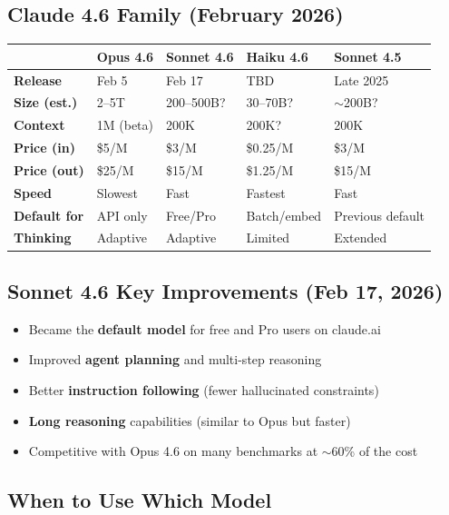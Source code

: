 \documentclass[11pt,a4paper]{article}
\begin{document}
\subsection{Claude 4.6 Family (February 2026)}

\begin{center}
\begin{tabular}{L{2.5cm}L{2.5cm}L{2.5cm}L{2.5cm}L{2.5cm}}
\toprule
& \textbf{Opus 4.6} & \textbf{Sonnet 4.6} & \textbf{Haiku 4.6} & \textbf{Sonnet 4.5} \\
\midrule
\textbf{Release} & Feb 5 & Feb 17 & TBD & Late 2025 \\
\textbf{Size (est.)} & 2--5T & 200--500B? & 30--70B? & $\sim$200B? \\
\textbf{Context} & 1M (beta) & 200K & 200K? & 200K \\
\textbf{Price (in)} & \$5/M & \$3/M & \$0.25/M & \$3/M \\
\textbf{Price (out)} & \$25/M & \$15/M & \$1.25/M & \$15/M \\
\textbf{Speed} & Slowest & Fast & Fastest & Fast \\
\textbf{Default for} & API only & Free/Pro & Batch/embed & Previous default \\
\textbf{Thinking} & Adaptive & Adaptive & Limited & Extended \\
\bottomrule
\end{tabular}
\end{center}

\subsection{Sonnet 4.6 Key Improvements (Feb 17, 2026)}

\begin{itemize}[itemsep=1pt]
  \item Became the \textbf{default model} for free and Pro users on claude.ai
  \item Improved \textbf{agent planning} and multi-step reasoning
  \item Better \textbf{instruction following} (fewer hallucinated constraints)
  \item \textbf{Long reasoning} capabilities (similar to Opus but faster)
  \item Competitive with Opus 4.6 on many benchmarks at $\sim$60\% of the cost
\end{itemize}

\subsection{When to Use Which Model}
\end{document}
